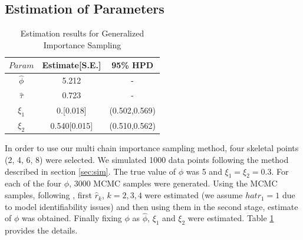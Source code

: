 \documentclass[11pt]{article}
\theoremstyle{remboldstyle}
\begin{document}
\subsection{Estimation of Parameters}
\begin{table}[h]
\caption{Estimation results for Generalized Importance Sampling}
\centering
\begin{tabular}{c c c }
\hline
$Param$      & Estimate[S.E.] & 95\% HPD\\
\hline
$\hat{\phi}$ &  5.212         & -\\
$\hat{\tau}$ &  0.723         & -\\
$\xi_1$      & 0.[0.018]        & (0.502,0.569)\\   
$\xi_2$      & 0.540[0.015]        & (0.510,0.562)\\
  \hline           
\end{tabular}
\label{tab2}
\end{table}
\noindent
In order to use our multi chain importance sampling method, four skeletal points (2, 4, 6, 8) were selected. We simulated 1000 data points following the method described in section \ref{sec:sim}. The true value of $\phi$ was 5 and $\xi_1 = \xi_2 = 0.3$. For each of the four $\phi$, 3000 MCMC samples were generated. Using the MCMC samples, following \cite{geyer:1994}, first $\hat{r}_k$, $k = 2, 3, 4$ were estimated (we assume $hat{r}_1 = 1$ due to model identifiability issues) and then using them in the second stage, estimate of $\phi$ was obtained. Finally fixing $\phi$ as $\hat{\phi}$, $\xi_1$ and $\xi_2$ were estimated. Table \ref{tab2} provides the details.
\end{document}
